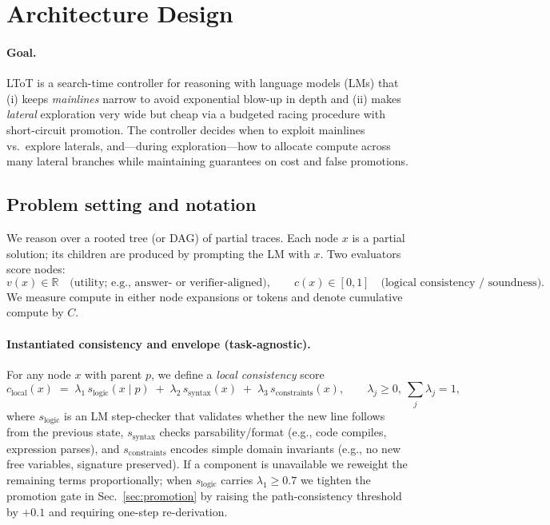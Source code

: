 \documentclass{article}
\begin{document}
\section{Architecture Design}
\label{section:architecture-design}

\paragraph{Goal.}
LToT is a search-time controller for reasoning with language models (LMs) that
(i) keeps \emph{mainlines} narrow to avoid exponential blow-up in depth and
(ii) makes \emph{lateral} exploration very wide but cheap via a budgeted racing procedure with short-circuit promotion.
The controller decides when to exploit mainlines vs.\ explore laterals, and—during exploration—how to allocate compute across many lateral branches while maintaining guarantees on cost and false promotions.

\vspace{0.5em}
\subsection{Problem setting and notation}

We reason over a rooted tree (or DAG) of partial traces.
Each node $x$ is a partial solution; its children are produced by prompting the LM with $x$.
Two evaluators score nodes:
\[
v(x) \in \mathbb{R} \quad \text{(utility; e.g., answer- or verifier-aligned)}, \qquad
c(x) \in [0,1] \quad \text{(logical consistency / soundness)}.
\]
We measure compute in either node expansions or tokens and denote cumulative compute by $C$.


\paragraph{Instantiated consistency and envelope (task-agnostic).}
For any node $x$ with parent $p$, we define a \emph{local consistency} score
\begin{equation}
c_{\text{local}}(x)\;=\;\lambda_1\,s_{\text{logic}}(x\mid p)\;+\;\lambda_2\,s_{\text{syntax}}(x)\;+\;\lambda_3\,s_{\text{constraints}}(x),
\qquad \lambda_j\!\ge 0,\ \sum_j \lambda_j=1,
\end{equation}
where $s_{\text{logic}}$ is an LM step-checker that validates whether the new line follows from the previous state,
$s_{\text{syntax}}$ checks parsability/format (e.g., code compiles, expression parses), and
$s_{\text{constraints}}$ encodes simple domain invariants (e.g., no new free variables, signature preserved).
If a component is unavailable we reweight the remaining terms proportionally; when $s_{\text{logic}}$ carries $\lambda_1\ge 0.7$ we tighten the promotion gate in Sec.~\ref{sec:promotion} by raising the path-consistency threshold by $+0.1$ and requiring one-step re-derivation.
\end{document}
